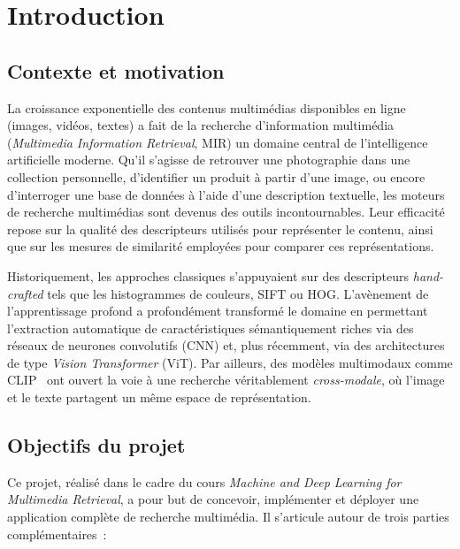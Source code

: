 \documentclass[a4paper,11pt]{article}
\begin{document}
\umonsCoverPage

\tableofcontents
\newpage

\setcounter{page}{1}

\section{Introduction}

\subsection{Contexte et motivation}

La croissance exponentielle des contenus multimédias disponibles en ligne (images, vidéos, textes) a fait de la recherche d'information multimédia (\textit{Multimedia Information Retrieval}, MIR) un domaine central de l'intelligence artificielle moderne. Qu'il s'agisse de retrouver une photographie dans une collection personnelle, d'identifier un produit à partir d'une image, ou encore d'interroger une base de données à l'aide d'une description textuelle, les moteurs de recherche multimédias sont devenus des outils incontournables. Leur efficacité repose sur la qualité des descripteurs utilisés pour représenter le contenu, ainsi que sur les mesures de similarité employées pour comparer ces représentations.

Historiquement, les approches classiques s'appuyaient sur des descripteurs \textit{hand-crafted} tels que les histogrammes de couleurs, SIFT ou HOG. L'avènement de l'apprentissage profond a profondément transformé le domaine en permettant l'extraction automatique de caractéristiques sémantiquement riches via des réseaux de neurones convolutifs (CNN) et, plus récemment, via des architectures de type \textit{Vision Transformer} (ViT). Par ailleurs, des modèles multimodaux comme CLIP~\cite{radford2021clip} ont ouvert la voie à une recherche véritablement \textit{cross-modale}, où l'image et le texte partagent un même espace de représentation.

\subsection{Objectifs du projet}

Ce projet, réalisé dans le cadre du cours \textit{Machine and Deep Learning for Multimedia Retrieval}, a pour but de concevoir, implémenter et déployer une application complète de recherche multimédia. Il s'articule autour de trois parties complémentaires~:
\end{document}
